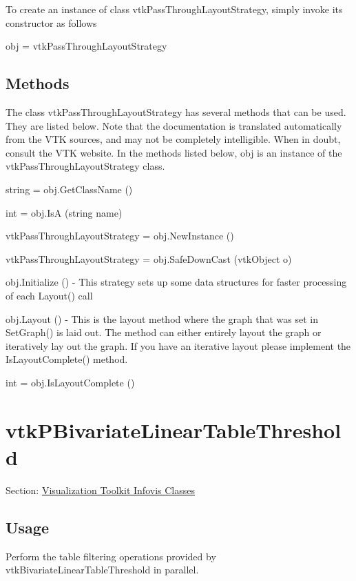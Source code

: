 To create an instance of class vtk\-Pass\-Through\-Layout\-Strategy, simply invoke its constructor as follows \begin{DoxyVerb}  obj = vtkPassThroughLayoutStrategy
\end{DoxyVerb}
 \hypertarget{vtkwidgets_vtkxyplotwidget_Methods}{}\subsection{Methods}\label{vtkwidgets_vtkxyplotwidget_Methods}
The class vtk\-Pass\-Through\-Layout\-Strategy has several methods that can be used. They are listed below. Note that the documentation is translated automatically from the V\-T\-K sources, and may not be completely intelligible. When in doubt, consult the V\-T\-K website. In the methods listed below, {\ttfamily obj} is an instance of the vtk\-Pass\-Through\-Layout\-Strategy class. 
\begin{DoxyItemize}
\item {\ttfamily string = obj.\-Get\-Class\-Name ()}  
\item {\ttfamily int = obj.\-Is\-A (string name)}  
\item {\ttfamily vtk\-Pass\-Through\-Layout\-Strategy = obj.\-New\-Instance ()}  
\item {\ttfamily vtk\-Pass\-Through\-Layout\-Strategy = obj.\-Safe\-Down\-Cast (vtk\-Object o)}  
\item {\ttfamily obj.\-Initialize ()} -\/ This strategy sets up some data structures for faster processing of each Layout() call  
\item {\ttfamily obj.\-Layout ()} -\/ This is the layout method where the graph that was set in Set\-Graph() is laid out. The method can either entirely layout the graph or iteratively lay out the graph. If you have an iterative layout please implement the Is\-Layout\-Complete() method.  
\item {\ttfamily int = obj.\-Is\-Layout\-Complete ()}  
\end{DoxyItemize}\hypertarget{vtkinfovis_vtkpbivariatelineartablethreshold}{}\section{vtk\-P\-Bivariate\-Linear\-Table\-Threshold}\label{vtkinfovis_vtkpbivariatelineartablethreshold}
Section\-: \hyperlink{sec_vtkinfovis}{Visualization Toolkit Infovis Classes} \hypertarget{vtkwidgets_vtkxyplotwidget_Usage}{}\subsection{Usage}\label{vtkwidgets_vtkxyplotwidget_Usage}
Perform the table filtering operations provided by vtk\-Bivariate\-Linear\-Table\-Threshold in parallel.

